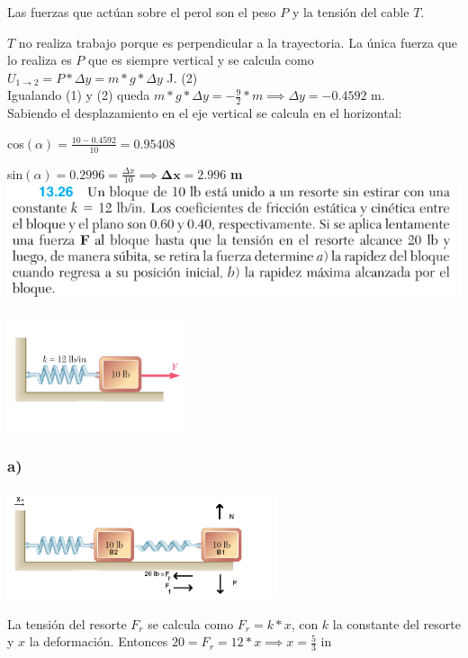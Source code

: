 \documentclass[12pt,fleqn]{article}
\begin{document}
Las fuerzas que actúan sobre el perol son el peso $P$ y la tensión del cable $T$.

$T$ no realiza trabajo porque es perpendicular a la trayectoria. La única fuerza que lo realiza es $P$ que es siempre vertical y se calcula como $U_{1\rightarrow 2}=P*\Delta y=m*g*\Delta y$ J. (2)\\

Igualando (1) y (2) queda $m*g*\Delta y=-\frac{9}{2}*m \implies \Delta y=-0.4592$ m.\\

Sabiendo el desplazamiento en el eje vertical se calcula en el horizontal:

cos$(\alpha)=\frac{10-0.4592}{10}=0.95408$

sin$(\alpha)=0.2996=\frac{\Delta x}{10}\implies \mathbf{\Delta x=2.996}$ \textbf{m}
\newpage
\includegraphics[width=\linewidth]{13.26}
\begin{center}\includegraphics[width=200px]{13.26.1}\end{center}
\subsubsection*{a)}
\begin{center}\includegraphics[width=300px]{13.26.0}\end{center}

La tensión del resorte $F_r$ se calcula como $F_r=k*x$, con $k$ la constante del resorte y $x$ la deformación. Entonces $20=F_r=12*x \implies x=\frac{5}{3}$ in\\
\end{document}
